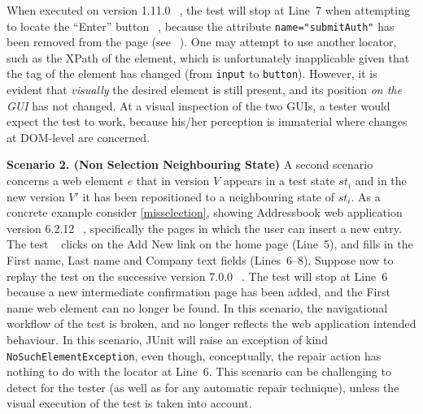 When executed on version 1.11.0~\textcircled{}, the test will stop at Line~7 when attempting to locate the ``Enter'' button~\textcircled{}, because the attribute \mbox{\texttt{name="submitAuth"}} has been removed from the page (see~\textcircled{}). One may attempt to use another locator, such as the XPath of the element, which is unfortunately inapplicable given that the tag of the element has changed (from \mbox{\texttt{input}} to \mbox{\texttt{button}}).
However, it is evident that \textit{visually} the desired element is still present, and its position \textit{on the GUI} has not changed. At a visual inspection of the two GUIs, a tester would expect the test to work, because his/her perception is immaterial where changes at DOM-level are concerned.

\noindent
\textbf{Scenario 2. (Non Selection Neighbouring State)} A second scenario concerns a web element $e$ that in version $V$ appears in a test state $st_i$ and in the new version $V'$ it has been repositioned to a neighbouring state of $st_i$. 
As a concrete example consider \autoref{misselection}, showing Addressbook web application version 6.2.12~\textcircled{}, specifically the pages in which the user can insert a new entry. The test~\textcircled{} clicks on the Add New link on the home page (Line~5), and fills in the First name, Last name and Company text fields (Lines~6--8).
Suppose now to replay the test on the successive version 7.0.0~\textcircled{}. The test will stop at Line~6 because a new intermediate confirmation page has been added, and the First name web element can no longer be found. In this scenario, the navigational workflow of the test is broken, and no longer reflects the web application intended behaviour.
In this scenario, JUnit will raise an exception of kind \texttt{NoSuchElementException}, even though, conceptually, the repair action has nothing to do with the locator at Line~6. 
This scenario can be challenging to detect for the tester (as well as for any automatic repair technique), unless the visual execution of the test is taken into account.

